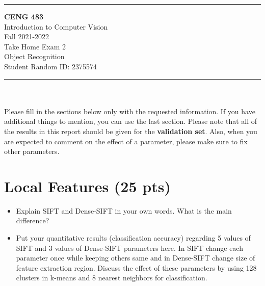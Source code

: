 \documentclass[12pt]{article}
\newcommand{\HRule}{\rule{\linewidth}{1mm}}
\begin{document}
\noindent
\HRule %
\small
\begin{center}
    \LARGE \textbf{CENG 483} \\[4mm]
    \Large Introduction to Computer Vision \\[4mm]
    \normalsize Fall 2021-2022 \\
    \Large Take Home Exam 2 \\
    \Large Object Recognition \\
    \Large Student Random ID: 2375574 \\
\end{center}
\HRule

\begin{center}
\end{center}
\vspace{-10mm}
\noindent\\ \\ 
Please fill in the sections below only with the requested information. If you have additional things to mention, you can use the last section. Please note that all of the results in this report should be given for the \textbf{validation set}. Also, when you are expected to comment on the effect of a parameter, please make sure to fix other parameters.

\section{Local Features (25 pts)}
    \begin{itemize}
        \item Explain SIFT and Dense-SIFT in your own words. What is the main difference?
        
        \item Put your quantitative results (classification accuracy) regarding 5 values of SIFT and 3 values of Dense-SIFT parameters here. In SIFT change each parameter once while keeping others same and in Dense-SIFT change size of feature extraction region. Discuss the effect of these parameters by using 128 clusters in k-means and 8 nearest neighbors for classification.
        
    \end{itemize}
    
\end{document}
